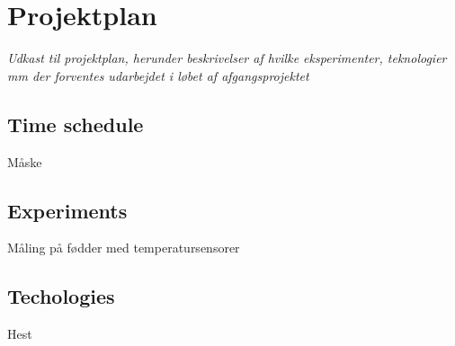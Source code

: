 \chapter{Projektplan}
\textit{Udkast til projektplan, herunder beskrivelser af hvilke eksperimenter, teknologier mm der forventes udarbejdet i løbet af afgangsprojektet}\\

\section{Time schedule}
Måske

\section{Experiments}
Måling på fødder med temperatursensorer

\section{Techologies}
Hest
 